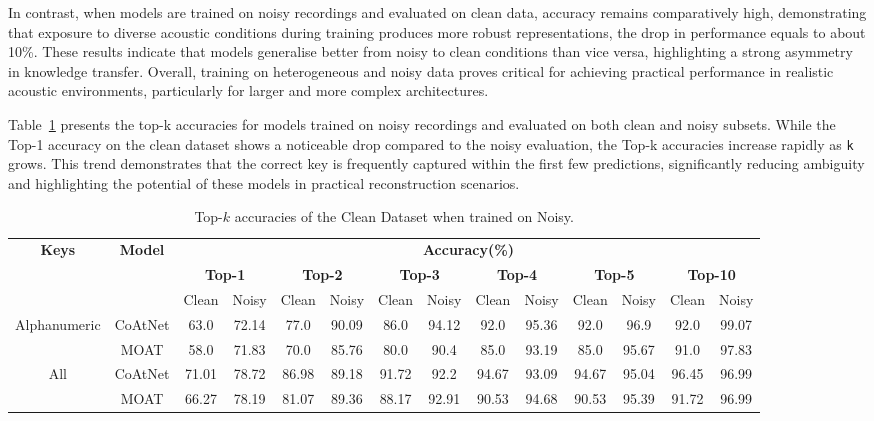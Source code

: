 \documentclass[a4paper,11pt,twoside]{report}
\theoremstyle{definition}
\begin{document}
In contrast, when models are trained on noisy recordings and evaluated on clean data, accuracy remains comparatively high, demonstrating that exposure to diverse acoustic conditions during training produces more robust representations, the drop in performance equals to about 10\%. These results indicate that models generalise better from noisy to clean conditions than vice versa, highlighting a strong asymmetry in knowledge transfer. Overall, training on heterogeneous and noisy data proves critical for achieving practical performance in realistic acoustic environments, particularly for larger and more complex architectures.


Table~\ref{tab:topk_noisy_train} presents the top-k accuracies for models trained on noisy recordings and evaluated on both clean and noisy subsets. While the Top-1 accuracy on the clean dataset shows a noticeable drop compared to the noisy evaluation, the Top-k accuracies increase rapidly as \texttt{k} grows. This trend demonstrates that the correct key is frequently captured within the first few predictions, significantly reducing ambiguity and highlighting the potential of these models in practical reconstruction scenarios.



\begin{table}[h!]
\centering
\caption{Top-$k$ accuracies of the Clean Dataset when trained on Noisy.}
\begin{adjustbox}{max width=\textwidth}
\begin{tabular}{c|c|c c | c c | c c | c c | c c | c c}
\hline
\textbf{Keys} & \textbf{Model} & \multicolumn{12}{c}{\textbf{Accuracy(\%)}} \\
\cline{3-14}
& & \multicolumn{2}{c|}{\textbf{Top-1}} & \multicolumn{2}{c|}{\textbf{Top-2}} & \multicolumn{2}{c|}{\textbf{Top-3}} & \multicolumn{2}{c|}{\textbf{Top-4}} & \multicolumn{2}{c|}{\textbf{Top-5}} & \multicolumn{2}{c}{\textbf{Top-10}} \\
\cline{3-14}
& & Clean & Noisy & Clean & Noisy & Clean & Noisy & Clean & Noisy & Clean & Noisy & Clean & Noisy \\
\hline
\multirow{2}{*}{Alphanumeric} & CoAtNet & 63.0 & 72.14 & 77.0 & 90.09 & 86.0 & 94.12 &  92.0 & 95.36 & 92.0 & 96.9 & 92.0 & 99.07\\
                              & MOAT & 58.0 & 71.83 & 70.0 & 85.76 & 80.0 & 90.4 &  85.0 & 93.19 & 85.0  & 95.67& 91.0 & 97.83\\
\hline
\multirow{2}{*}{All} & CoAtNet  & 71.01 & 78.72 & 86.98 & 89.18 & 91.72 & 92.2 & 94.67 & 93.09 & 94.67 & 95.04 & 96.45 & 96.99 \\
                    & MOAT    & 66.27 & 78.19 & 81.07 & 89.36 & 88.17 & 92.91 & 90.53 & 94.68 & 90.53 & 95.39 & 91.72 & 96.99 \\

\hline
\end{tabular}
\end{adjustbox}
\label{tab:topk_noisy_train}
\end{table}
\end{document}
